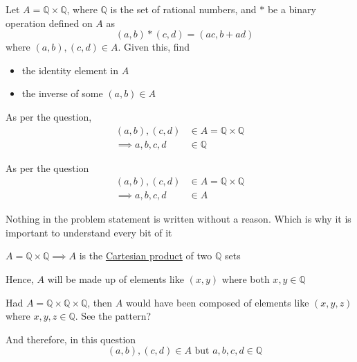 \documentclass[14pt,fleqn]{extarticle}
\newcommand\Q{\mathbb{Q}}
\begin{document}
 
\begin{question}
	\statement 
    
    Let $A = \Q\times\Q$, where $\Q$ is the set of rational numbers, and $*$ be a binary operation defined on $A$ as 
    \[ \quad \left(a,b \right) * \left(c,d \right) = \left(a c,b + a d \right)\] where $\left(a,b \right), \left(c,d \right)\in A$. Given this, find 
    \begin{itemize}
    \item{ the identity element in $A$} 
    \item{ the inverse of some $(a,b)\in A$}
    \end{itemize}
    
    \begin{step}
  \begin{options} 
     \correct 
       
     As per the question, 
     \begin{align}
	   \left(a,b \right), \left(c,d \right)&\in A = \Q\times\Q \\
	   \implies a,b,c,d &\in \Q 
\end{align}
       
     \incorrect
        
      As per the question 
     \begin{align}
	   \left(a,b \right), \left(c,d \right)&\in A = \Q\times\Q \\
	   \implies a,b,c,d &\in A 
\end{align}
    \end{options} 
     \reason
     
     Nothing in the problem statement is written without a reason. 
     Which is why it is important to understand every bit of it \newline 
     
     $A = \Q\times\Q \implies A$ is the \underline{Cartesian product} of 
     two $\Q$ sets \newline 
     
     Hence, $A$ will be made up of elements like $\left(x,y \right)$ where both 
     $x,y\in\Q$ \newline 
     
     Had $A = \Q\times\Q\times\Q$, then $A$ would have been composed of 
     elements like $\left(x,y,z \right)$ where $x,y,z\in\Q$. See the pattern? \newline 
     
     
     And therefore, in this question 
     \[ \quad \left(a,b \right), \left(c,d \right)\in A\text{ but } a,b,c,d\in\Q \]
      

\end{step}
\end{question}
\end{document}
